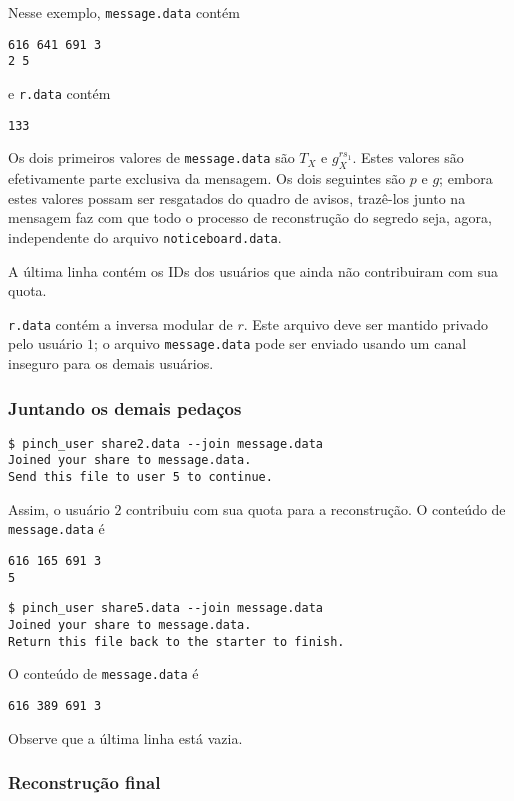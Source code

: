 \documentclass[10pt,twocolumn]{article}
\begin{document}
Nesse exemplo,
\verb"message.data" contém
\begin{verbatim}
616 641 691 3
2 5
\end{verbatim}
e \verb"r.data" contém
\begin{verbatim}
133
\end{verbatim}
Os dois primeiros valores de \verb"message.data" são
$T_X$ e $g_X^{r s_1}$.
Estes valores são efetivamente parte exclusiva da mensagem.
Os dois seguintes são $p$ e $g$;
embora estes valores possam ser resgatados do quadro de avisos,
trazê-los junto na mensagem faz com que todo o processo de reconstrução do segredo
seja, agora, independente do arquivo \verb"noticeboard.data".

A última linha contém os IDs dos usuários que ainda não contribuiram com sua quota.

\verb"r.data" contém a inversa modular de $r$.
Este arquivo deve ser mantido privado pelo usuário $1$;
o arquivo \verb"message.data" pode ser enviado usando um canal inseguro
para os demais usuários.

\subsubsection{Juntando os demais pedaços}

\begin{verbatim}
$ pinch_user share2.data --join message.data
Joined your share to message.data.
Send this file to user 5 to continue.
\end{verbatim}
Assim, o usuário $2$ contribuiu com sua quota para a reconstrução.
O conteúdo de \verb"message.data" é
\begin{verbatim}
616 165 691 3
5
\end{verbatim}

\begin{verbatim}
$ pinch_user share5.data --join message.data
Joined your share to message.data.
Return this file back to the starter to finish.
\end{verbatim}

O conteúdo de \verb"message.data" é
\begin{verbatim}
616 389 691 3

\end{verbatim}
Observe que a última linha está vazia.

\subsubsection{Reconstrução final}
\end{document}
